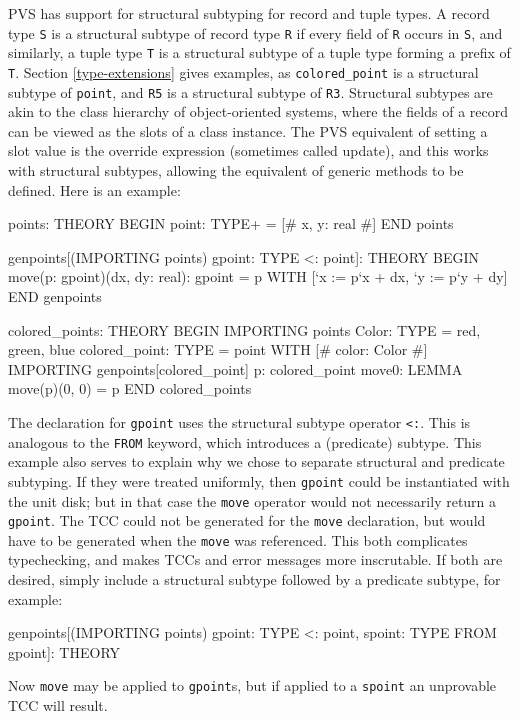 PVS has support for structural subtyping for record and tuple types.  A
record type \texttt{S} is a structural subtype of record type \texttt{R}
if every field of \texttt{R} occurs in \texttt{S}, and similarly, a tuple
type \texttt{T} is a structural subtype of a tuple type forming a prefix
of \texttt{T}.  Section \ref{type-extensions} gives
examples, as \texttt{colored\_point} is a structural subtype of
\texttt{point}, and \texttt{R5} is a structural subtype of \texttt{R3}.
Structural subtypes are akin to the class hierarchy of object-oriented
systems, where the fields of a record can be viewed as the slots of a
class instance.  The PVS equivalent of setting a slot value is the
override expression (sometimes called update), and this works with
structural subtypes, allowing the equivalent of generic methods to be
defined.  Here is an example:
\begin{pvsex}
points: THEORY
BEGIN
 point: TYPE+ = [# x, y: real #]
END points

genpoints[(IMPORTING points) gpoint: TYPE <: point]: THEORY
BEGIN
 move(p: gpoint)(dx, dy: real): gpoint =
  p WITH [`x := p`x + dx, `y := p`y + dy]
END genpoints

colored_points: THEORY
BEGIN
 IMPORTING points
 Color: TYPE = {red, green, blue}
 colored_point: TYPE = point WITH [# color: Color #]
 IMPORTING genpoints[colored_point]
 p: colored_point
 move0: LEMMA move(p)(0, 0) = p
END colored_points
\end{pvsex}

The declaration for \texttt{gpoint} uses the structural subtype operator
\texttt{<:}.  This is analogous to the \texttt{FROM} keyword, which
introduces a (predicate) subtype.  This example also serves to explain
why we chose to separate structural and predicate subtyping.  If they
were treated uniformly, then \texttt{gpoint} could be instantiated with
the unit disk; but in that case the \texttt{move} operator would not
necessarily return a \texttt{gpoint}.  The TCC could not be generated
for the \texttt{move} declaration, but would have to be generated when
the \texttt{move} was referenced.  This both complicates typechecking,
and makes TCCs and error messages more inscrutable.  If both are
desired, simply include a structural subtype followed by a predicate
subtype, for example:
\begin{pvsex}
genpoints[(IMPORTING points) gpoint: TYPE <: point,
          spoint: TYPE FROM gpoint]: THEORY
\end{pvsex}
Now \texttt{move} may be applied to \texttt{gpoint}s, but if applied to a
\texttt{spoint} an unprovable TCC will result.


